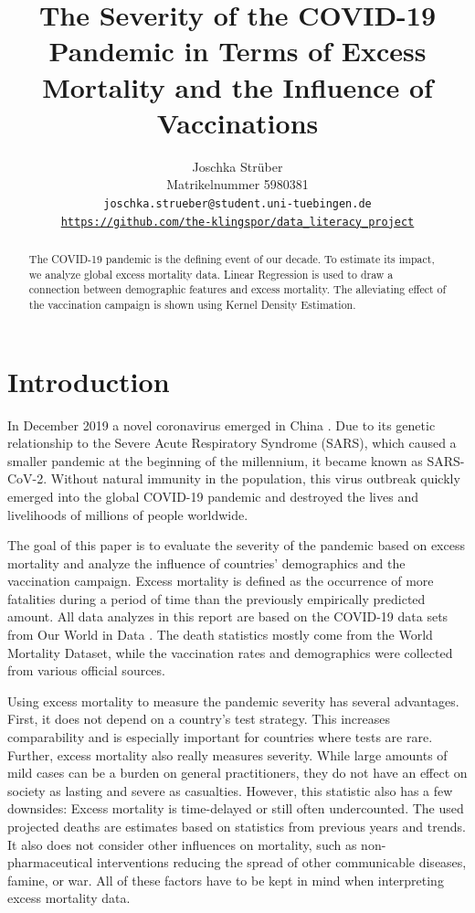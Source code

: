 \documentclass{article}
\title{The Severity of the COVID-19 Pandemic in Terms of Excess Mortality and the Influence of Vaccinations}
\author{%
  Joschka Strüber\\
  Matrikelnummer 5980381\\
  \texttt{joschka.strueber@student.uni-tuebingen.de}\\
  \texttt{\url{https://github.com/the-klingspor/data_literacy_project}}
}
\begin{document}
\maketitle

\begin{abstract}
  
The COVID-19 pandemic is the defining event of our decade. To estimate its impact, we analyze 
global excess mortality data. Linear Regression is used to draw a connection between demographic features and excess mortality. The alleviating effect of the vaccination campaign is shown using Kernel Density Estimation.
  
\end{abstract}

\section{Introduction}

In December 2019 a novel coronavirus emerged in China \citep{zhou20}. Due to its genetic relationship to the Severe Acute Respiratory Syndrome (SARS), which caused a smaller pandemic at the beginning of the millennium, it became known as SARS-CoV-2. Without natural immunity in the population, this virus outbreak quickly emerged into the global COVID-19 pandemic and destroyed the lives and livelihoods of millions of people worldwide.

The goal of this paper is to evaluate the severity of the pandemic based on excess mortality and analyze the influence of countries' demographics and the vaccination campaign. Excess mortality is defined as the occurrence of more fatalities during a period of time than the previously empirically predicted amount. All data analyzes in this report are based on the COVID-19 data sets from Our World in Data \citep{owid_20}. The death statistics mostly come from the World Mortality Dataset, while the vaccination rates and demographics were collected from various official sources.

Using excess mortality to measure the pandemic severity has several advantages. First, it does not depend on a country's test strategy. This increases comparability and is especially important for countries where tests are rare. Further, excess mortality also really measures severity. While large amounts of mild cases can be a burden on general practitioners, they do not have an effect on society as lasting and severe as casualties. However, this statistic also has a few downsides: Excess mortality is time-delayed or still often undercounted. The used projected deaths are estimates based on statistics from previous years and trends. It also does not consider other influences on mortality, such as non-pharmaceutical interventions reducing the spread of other communicable diseases, famine, or war. All of these factors have to be kept in mind when interpreting excess mortality data.
\end{document}
